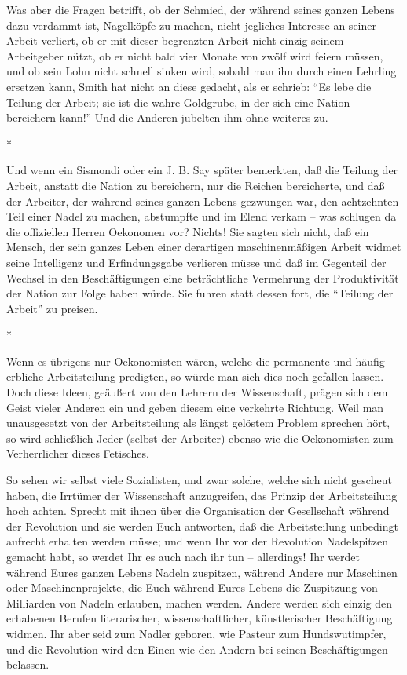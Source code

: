 \documentclass{scrbook}
\begin{document}
Was aber die Fragen betrifft, ob der Schmied, der während seines ganzen Lebens dazu verdammt ist, Nagelköpfe zu machen, nicht jegliches Interesse an seiner Arbeit verliert, ob er mit dieser begrenzten Arbeit nicht einzig seinem Arbeitgeber nützt, ob er nicht bald vier Monate von zwölf wird feiern müssen, und ob sein Lohn nicht schnell sinken wird, sobald man ihn durch einen Lehrling ersetzen kann, Smith hat nicht an diese gedacht, als er schrieb: ``Es lebe die Teilung der Arbeit; sie ist die wahre Goldgrube, in der sich eine Nation bereichern kann!'' Und die Anderen jubelten ihm ohne weiteres zu.

\begin{center}*\end{center}

Und wenn ein Sismondi oder ein J. B. Say später bemerkten, daß die Teilung der Arbeit, anstatt die Nation zu bereichern, nur die Reichen bereicherte, und daß der Arbeiter, der während seines ganzen Lebens gezwungen war, den achtzehnten Teil einer Nadel zu machen, abstumpfte und im Elend verkam – was schlugen da die offiziellen Herren Oekonomen vor? Nichts! Sie sagten sich nicht, daß ein Mensch, der sein ganzes Leben einer derartigen maschinenmäßigen Arbeit widmet seine Intelligenz und Erfindungsgabe verlieren müsse und daß im Gegenteil der Wechsel in den Beschäftigungen eine beträchtliche Vermehrung der Produktivität der Nation zur Folge haben würde. Sie fuhren statt dessen fort, die ``Teilung der Arbeit'' zu preisen.

\begin{center}*\end{center}

Wenn es übrigens nur Oekonomisten wären, welche die permanente und häufig erbliche Arbeitsteilung predigten, so würde man sich dies noch gefallen lassen. Doch diese Ideen, geäußert von den Lehrern der Wissenschaft, prägen sich dem Geist vieler Anderen ein und geben diesem eine verkehrte Richtung. Weil man unausgesetzt von der Arbeitsteilung als längst gelöstem Problem sprechen hört, so wird schließlich Jeder (selbst der Arbeiter) ebenso wie die Oekonomisten zum Verherrlicher dieses Fetisches.

So sehen wir selbst viele Sozialisten, und zwar solche, welche sich nicht gescheut haben, die Irrtümer der Wissenschaft anzugreifen, das Prinzip der Arbeitsteilung hoch achten. Sprecht mit ihnen über die Organisation der Gesellschaft während der Revolution und sie werden Euch antworten, daß die Arbeitsteilung unbedingt aufrecht erhalten werden müsse; und wenn Ihr vor der Revolution Nadelspitzen gemacht habt, so werdet Ihr es auch nach ihr tun – allerdings! Ihr werdet während Eures ganzen Lebens Nadeln zuspitzen, während Andere nur Maschinen oder Maschinenprojekte, die Euch während Eures Lebens die Zuspitzung von Milliarden von Nadeln erlauben, machen werden. Andere werden sich einzig den erhabenen Berufen literarischer, wissenschaftlicher, künstlerischer Beschäftigung widmen. Ihr aber seid zum Nadler geboren, wie Pasteur zum Hundswutimpfer, und die Revolution wird den Einen wie den Andern bei seinen Beschäftigungen belassen.
\end{document}
